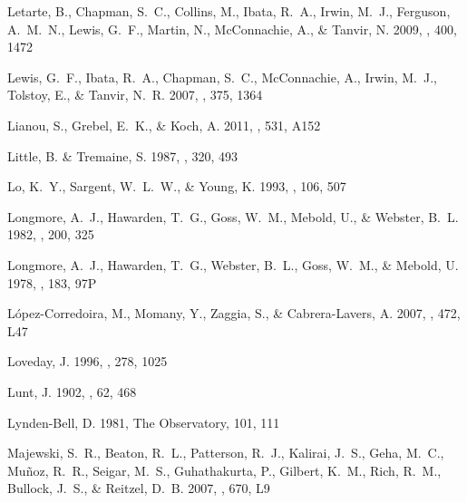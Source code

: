 \documentclass[manuscript]{aastex}
\begin{document}
\begin{thebibliography}{381}
{Letarte}, B., {Chapman}, S.~C., {Collins}, M., {Ibata}, R.~A., {Irwin}, M.~J.,
  {Ferguson}, A.~M.~N., {Lewis}, G.~F., {Martin}, N., {McConnachie}, A., \&
  {Tanvir}, N. 2009, \mnras, 400, 1472

{Lewis}, G.~F., {Ibata}, R.~A., {Chapman}, S.~C., {McConnachie}, A., {Irwin},
  M.~J., {Tolstoy}, E., \& {Tanvir}, N.~R. 2007, \mnras, 375, 1364

{Lianou}, S., {Grebel}, E.~K., \& {Koch}, A. 2011, \aap, 531, A152

{Little}, B. \& {Tremaine}, S. 1987, \apj, 320, 493

{Lo}, K.~Y., {Sargent}, W.~L.~W., \& {Young}, K. 1993, \aj, 106, 507

{Longmore}, A.~J., {Hawarden}, T.~G., {Goss}, W.~M., {Mebold}, U., \&
  {Webster}, B.~L. 1982, \mnras, 200, 325

{Longmore}, A.~J., {Hawarden}, T.~G., {Webster}, B.~L., {Goss}, W.~M., \&
  {Mebold}, U. 1978, \mnras, 183, 97P

{L{\'o}pez-Corredoira}, M., {Momany}, Y., {Zaggia}, S., \& {Cabrera-Lavers}, A.
  2007, \aap, 472, L47

{Loveday}, J. 1996, \mnras, 278, 1025

{Lunt}, J. 1902, \mnras, 62, 468

{Lynden-Bell}, D. 1981, The Observatory, 101, 111

{Majewski}, S.~R., {Beaton}, R.~L., {Patterson}, R.~J., {Kalirai}, J.~S.,
  {Geha}, M.~C., {Mu{\~n}oz}, R.~R., {Seigar}, M.~S., {Guhathakurta}, P.,
  {Gilbert}, K.~M., {Rich}, R.~M., {Bullock}, J.~S., \& {Reitzel}, D.~B. 2007,
  \apjl, 670, L9


\end{thebibliography}
\end{document}
